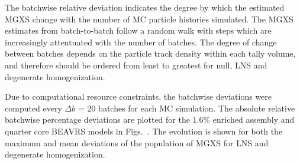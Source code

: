 \noindent The batchwise relative deviation indicates the degree by which the estimated \ac{MGXS} change with the number of \ac{MC} particle histories simulated. The \ac{MGXS} estimates from batch-to-batch follow a random walk with steps which are increasingly attentuated with the number of batches. The degree of change between batches depends on the particle track density within each tally volume, and therefore should be ordered from least to greatest for null, \ac{LNS} and degenerate homogenization.

Due to computational resource constraints, the batchwise deviations were computed every $\Delta b$ = 20 batches for each \ac{MC} simulation. The absolute relative batchwise percentage deviations are plotted for the 1.6\% enriched assembly and quarter core \ac{BEAVRS} models in Figs.~. The evolution is shown for both the maximum and mean deviations of the population of \ac{MGXS} for \ac{LNS} and degenerate homogenization.

